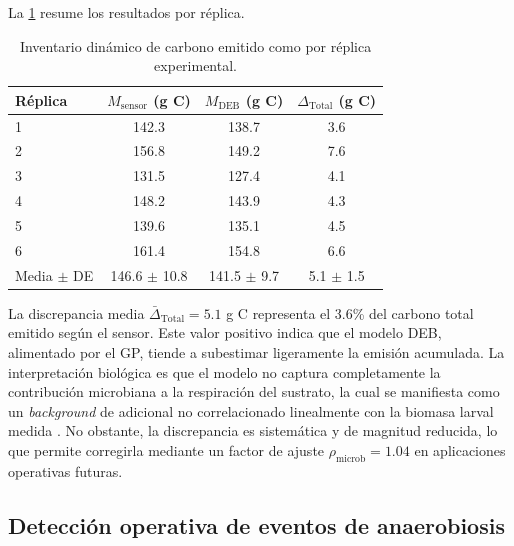La \cref{tab:cap4_inventario_carbono} resume los resultados por réplica.

\begin{table}[htbp]
    \centering
    \caption{Inventario dinámico de carbono emitido como  por réplica experimental.}
    \label{tab:cap4_inventario_carbono}
    \begin{tabular}{@{}lccc@{}}
        \toprule
        \textbf{Réplica} & \textbf{$M_{\mathrm{sensor}}$ (g C)} & \textbf{$M_{\mathrm{DEB}}$ (g C)} & \textbf{$\Delta_{\mathrm{Total}}$ (g C)} \\
        \midrule
        1 & \num{142.3} & \num{138.7} & \num{+3.6} \\
        2 & \num{156.8} & \num{149.2} & \num{+7.6} \\
        3 & \num{131.5} & \num{127.4} & \num{+4.1} \\
        4 & \num{148.2} & \num{143.9} & \num{+4.3} \\
        5 & \num{139.6} & \num{135.1} & \num{+4.5} \\
        6 & \num{161.4} & \num{154.8} & \num{+6.6} \\
        \midrule
        Media $\pm$ DE & \num{146.6} $\pm$ \num{10.8} & \num{141.5} $\pm$ \num{9.7} & \num{+5.1} $\pm$ \num{1.5} \\
        \bottomrule
    \end{tabular}
\end{table}

La discrepancia media $\bar{\Delta}_{\mathrm{Total}} = \num{+5.1}$ g C representa el \num{3.6}\% del carbono total emitido según el sensor. Este valor positivo indica que el modelo DEB, alimentado por el GP, tiende a subestimar ligeramente la emisión acumulada. La interpretación biológica es que el modelo no captura completamente la contribución microbiana a la respiración del sustrato, la cual se manifiesta como un \emph{background} de  adicional no correlacionado linealmente con la biomasa larval medida \parencite{rossiEstimatingDynamicsGreenhouse2024}. No obstante, la discrepancia es sistemática y de magnitud reducida, lo que permite corregirla mediante un factor de ajuste $\rho_{\mathrm{microb}} = \num{1.04}$ en aplicaciones operativas futuras.

\subsection{Detección operativa de eventos de anaerobiosis}
\label{subsec:cap4_deteccion_anaerobiosis}

